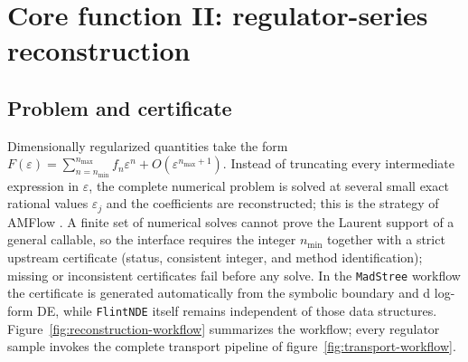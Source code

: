 \documentclass[11pt,a4paper]{article}
\begin{document}
\section{Core function II: regulator-series reconstruction}
\label{sec:reconstruction}

\subsection{Problem and certificate}
\label{sec:reconstruction-problem}

Dimensionally regularized quantities take the form
$F(\varepsilon)=\sum_{n=n_{\min}}^{n_{\max}}f_n\varepsilon^n+O(\varepsilon^{n_{\max}+1})$.
Instead of truncating every intermediate expression in $\varepsilon$, the complete
numerical problem is solved at several small exact rational values $\varepsilon_j$ and the
coefficients are reconstructed; this is the strategy of AMFlow \cite{Liu:2022chg}. A finite
set of numerical solves cannot prove the Laurent support of a general callable, so the
interface requires the integer $n_{\min}$ together with a strict upstream certificate
(status, consistent integer, and method identification); missing or inconsistent
certificates fail before any solve. In the \texttt{MadStree} workflow the certificate is
generated automatically from the symbolic boundary and d log-form DE, while
\texttt{FlintNDE} itself remains independent of those data structures.
Figure~\ref{fig:reconstruction-workflow} summarizes the workflow; every regulator sample
invokes the complete transport pipeline of figure~\ref{fig:transport-workflow}.
\end{document}
